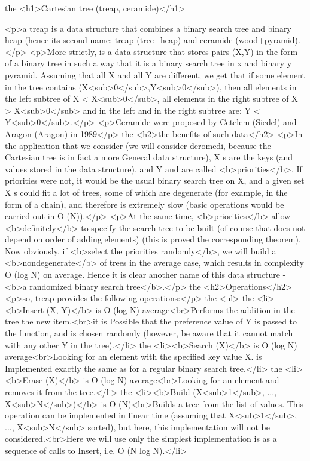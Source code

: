 the <h1>Cartesian tree (treap, ceramide)</h1>

<p>a treap is a data structure that combines a binary search tree and binary heap (hence its second name: treap (tree+heap) and ceramide (wood+pyramid).</p>
<p>More strictly, is a data structure that stores pairs (X,Y) in the form of a binary tree in such a way that it is a binary search tree in x and binary y pyramid. Assuming that all X and all Y are different, we get that if some element in the tree contains (X<sub>0</sub>,Y<sub>0</sub>), then all elements in the left subtree of X < X<sub>0</sub>, all elements in the right subtree of X > X<sub>0</sub> and in the left and in the right subtree are: Y < Y<sub>0</sub>.</p>
<p>Ceramide were proposed by Cetelem (Siedel) and Aragon (Aragon) in 1989</p>
the <h2>the benefits of such data</h2>
<p>In the application that we consider (we will consider deromedi, because the Cartesian tree is in fact a more General data structure), X s are the keys (and values stored in the data structure), and Y and are called <b>priorities</b>. If priorities were not, it would be the usual binary search tree on X, and a given set X s could fit a lot of trees, some of which are degenerate (for example, in the form of a chain), and therefore is extremely slow (basic operations would be carried out in O (N)).</p>
<p>At the same time, <b>priorities</b> allow <b>definitely</b> to specify the search tree to be built (of course that does not depend on order of adding elements) (this is proved the corresponding theorem). Now obviously, if <b>select the priorities randomly</b>, we will build a <b>nondegenerate</b> of trees in the average case, which results in complexity O (log N) on average. Hence it is clear another name of this data structure - <b>a randomized binary search tree</b>.</p>
the <h2>Operations</h2>
<p>so, treap provides the following operations:</p>
the <ul>
the <li><b>Insert (X, Y)</b> is O (log N) average<br>Performs the addition in the tree the new item.<br>it is Possible that the preference value of Y is passed to the function, and is chosen randomly (however, be aware that it cannot match with any other Y in the tree).</li>
the <li><b>Search (X)</b> is O (log N) average<br>Looking for an element with the specified key value X. is Implemented exactly the same as for a regular binary search tree.</li>
the <li><b>Erase (X)</b> is O (log N) average<br>Looking for an element and removes it from the tree.</li>
the <li><b>Build (X<sub>1</sub>, ..., X<sub>N</sub>)</b> is O (N)<br>Builds a tree from the list of values. This operation can be implemented in linear time (assuming that X<sub>1</sub>, ..., X<sub>N</sub> sorted), but here, this implementation will not be considered.<br>Here we will use only the simplest implementation is as a sequence of calls to Insert, i.e. O (N log N).</li>
